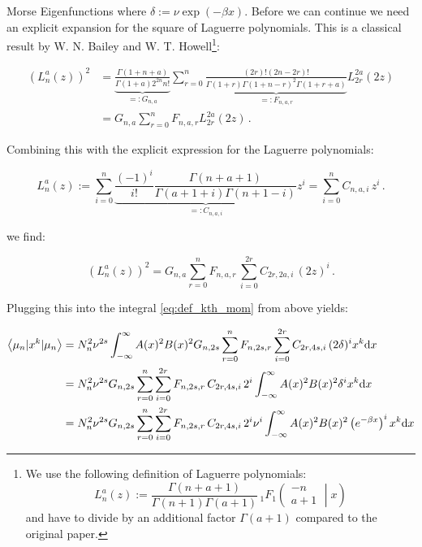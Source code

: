 \begin{chapter}{Morse Eigenfunctions}
where $\delta := \nu \exp(-\beta x)$. Before we can continue we need an explicit expansion
for the square of Laguerre polynomials. This is a classical result by W. N. Bailey
and W. T. Howell\footnote{
We use the following definition of Laguerre polynomials:
\begin{equation*}
  L_{n}^{a}(z)
  :=
  \frac{\Gamma(n+a+1)}{\Gamma(n+1) \Gamma(a+1)}
  \,
  {}_{1}F_{1}
  \left(
    \begin{matrix}
      - n \\
      a+1
    \end{matrix}
    \middle| {x} \right)
\end{equation*}
and have to divide by an additional factor $\Gamma(a+1)$ compared to the original paper.}:

\begin{align}
  \left( L_{n}^{a}(z) \right)^{2}
  & =
  \underbrace{\frac{\Gamma(1+n+a)}{\Gamma(1+a) 2^{2n}n!}}_{=: G_{n,a}}
  \sum_{r=0}^{n}
  \underbrace{\frac{(2r)! (2n-2r)!}{\Gamma(1+r) \Gamma(1+n-r)^{2} \Gamma(1+r+a)}}_{=: F_{n,a,r}}
  L_{2r}^{2a}(2z) \\
  & =
  G_{n,a} \sum_{r=0}^{n} F_{n,a,r} L_{2r}^{2a}(2z) \,.
\end{align}

Combining this with the explicit expression for the Laguerre polynomials:

\begin{equation}
  L_{n}^{a}(z)
  :=
  \sum_{i=0}^{n}
  \underbrace{
    \frac{(-1)^{i}}{i!}
    \frac{\Gamma(n+a+1)}{\Gamma(a+1+i) \Gamma(n+1-i)}
  }_{=: C_{n,a,i}}
  z^{i}
  = \sum_{i=0}^{n} C_{n,a,i} \, z^{i} \,.
\end{equation}

we find:

\begin{equation}
  \left( L_{n}^{a}(z) \right)^{2} =
  G_{n,a}
  \sum_{r=0}^{n}
  F_{n,a,r} \,
  \sum_{i=0}^{2 r}
  C_{2r,2a,i} \, (2 z)^{i} \,.
\end{equation}

Plugging this into the integral \eqref{eq:def_kth_mom} from above yields:

\begin{align*}
  \left\langle \mu_{n} | x^{k} | \mu_{n} \right\rangle
  & =
  N_{n}^{2} \nu^{2s} \int_{-\infty}^{\infty} A(x)^{2} B(x)^{2}
  G_{n,2s} \sum_{r=0}^{n} F_{n,2s,r} \sum_{i=0}^{2 r} C_{2r,4s,i} \, (2 \delta)^{i} x^{k} \mathrm{d}x \\
  & =
  N_{n}^{2} \nu^{2s} G_{n,2s} \sum_{r=0}^{n} \sum_{i=0}^{2 r} F_{n,2s,r} \, C_{2r,4s,i} \, 2^{i}
  \int_{-\infty}^{\infty} A(x)^{2} B(x)^{2} \delta^{i} x^{k} \mathrm{d}x \\
  & =
  N_{n}^{2} \nu^{2s} G_{n,2s} \sum_{r=0}^{n} \sum_{i=0}^{2 r} F_{n,2s,r} \, C_{2r,4s,i} \,
  2^{i} \nu^{i}
  \int_{-\infty}^{\infty} A(x)^{2} B(x)^{2} \left(e^{-\beta x}\right)^{i} x^{k} \mathrm{d}x
\end{align*}


\end{chapter}
